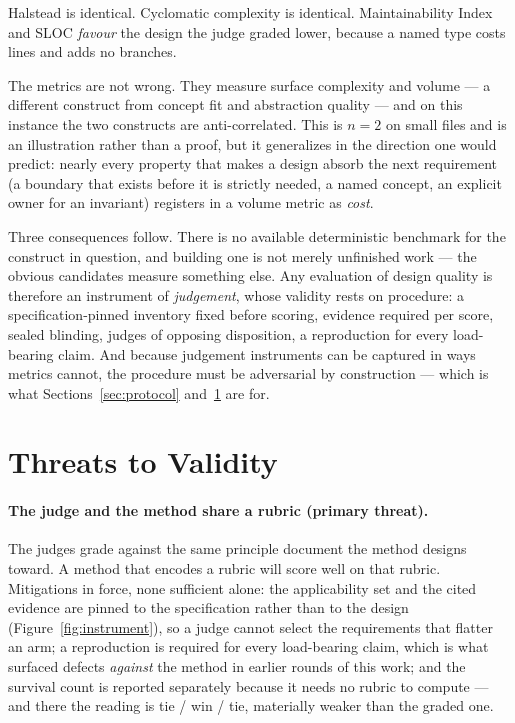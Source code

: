 \documentclass[11pt]{article}
\begin{document}
Halstead is identical. Cyclomatic complexity is identical. Maintainability Index and SLOC \emph{favour} the design the judge graded lower, because a named type costs lines and adds no branches.

The metrics are not wrong. They measure surface complexity and volume --- a different construct from concept fit and abstraction quality --- and on this instance the two constructs are anti-correlated. This is $n=2$ on small files and is an illustration rather than a proof, but it generalizes in the direction one would predict: nearly every property that makes a design absorb the next requirement (a boundary that exists before it is strictly needed, a named concept, an explicit owner for an invariant) registers in a volume metric as \emph{cost}.

Three consequences follow. There is no available deterministic benchmark for the construct in question, and building one is not merely unfinished work --- the obvious candidates measure something else. Any evaluation of design quality is therefore an instrument of \emph{judgement}, whose validity rests on procedure: a specification-pinned inventory fixed before scoring, evidence required per score, sealed blinding, judges of opposing disposition, a reproduction for every load-bearing claim. And because judgement instruments can be captured in ways metrics cannot, the procedure must be adversarial by construction --- which is what Sections~\ref{sec:protocol} and~\ref{sec:threats} are for.

\section{Threats to Validity}
\label{sec:threats}

\paragraph{The judge and the method share a rubric (primary threat).} The judges grade against the same principle document the method designs toward. A method that encodes a rubric will score well on that rubric. Mitigations in force, none sufficient alone: the applicability set and the cited evidence are pinned to the specification rather than to the design (Figure~\ref{fig:instrument}), so a judge cannot select the requirements that flatter an arm; a reproduction is required for every load-bearing claim, which is what surfaced defects \emph{against} the method in earlier rounds of this work; and the survival count is reported separately because it needs no rubric to compute --- and there the reading is tie / win / tie, materially weaker than the graded one.
\end{document}
